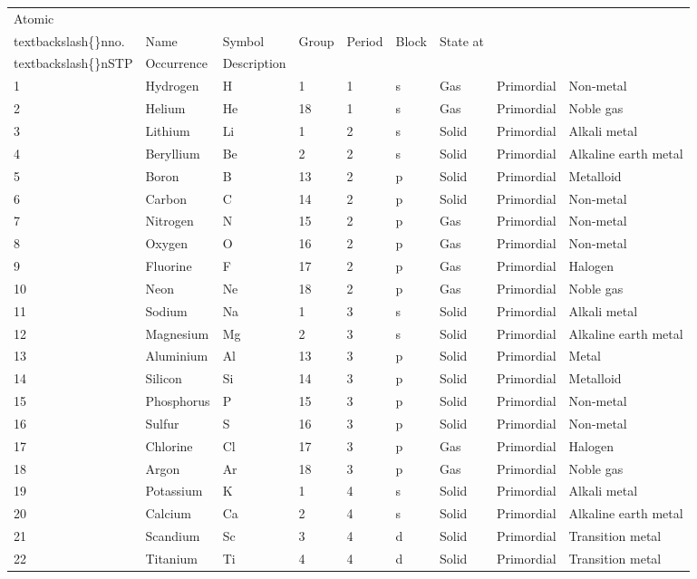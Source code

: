 \documentclass{article}
\begin{document}
\begin{tabular}{lllllllll}
\toprule
Atomic\\textbackslash\{\}nno. & Name & Symbol & Group & Period & Block & State at\\textbackslash\{\}nSTP & Occurrence & Description \\
\midrule
1 & Hydrogen & H & 1 & 1 & s & Gas & Primordial & Non-metal \\
2 & Helium & He & 18 & 1 & s & Gas & Primordial & Noble gas \\
3 & Lithium & Li & 1 & 2 & s & Solid & Primordial & Alkali metal \\
4 & Beryllium & Be & 2 & 2 & s & Solid & Primordial & Alkaline earth metal \\
5 & Boron & B & 13 & 2 & p & Solid & Primordial & Metalloid \\
6 & Carbon & C & 14 & 2 & p & Solid & Primordial & Non-metal \\
7 & Nitrogen & N & 15 & 2 & p & Gas & Primordial & Non-metal \\
8 & Oxygen & O & 16 & 2 & p & Gas & Primordial & Non-metal \\
9 & Fluorine & F & 17 & 2 & p & Gas & Primordial & Halogen \\
10 & Neon & Ne & 18 & 2 & p & Gas & Primordial & Noble gas \\
11 & Sodium & Na & 1 & 3 & s & Solid & Primordial & Alkali metal \\
12 & Magnesium & Mg & 2 & 3 & s & Solid & Primordial & Alkaline earth metal \\
13 & Aluminium & Al & 13 & 3 & p & Solid & Primordial & Metal \\
14 & Silicon & Si & 14 & 3 & p & Solid & Primordial & Metalloid \\
15 & Phosphorus & P & 15 & 3 & p & Solid & Primordial & Non-metal \\
16 & Sulfur & S & 16 & 3 & p & Solid & Primordial & Non-metal \\
17 & Chlorine & Cl & 17 & 3 & p & Gas & Primordial & Halogen \\
18 & Argon & Ar & 18 & 3 & p & Gas & Primordial & Noble gas \\
19 & Potassium & K & 1 & 4 & s & Solid & Primordial & Alkali metal \\
20 & Calcium & Ca & 2 & 4 & s & Solid & Primordial & Alkaline earth metal \\
21 & Scandium & Sc & 3 & 4 & d & Solid & Primordial & Transition metal \\
22 & Titanium & Ti & 4 & 4 & d & Solid & Primordial & Transition metal \\

\end{tabular}
\end{document}
